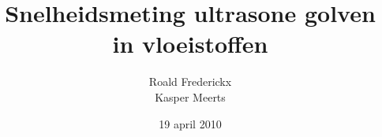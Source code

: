 \documentclass[11pt,a4paper]{article}
\author{Roald Frederickx\\Kasper Meerts}
\title{Snelheidsmeting ultrasone golven in vloeistoffen}
\date{19 april 2010}
\begin{document}
\graphicspath{{"./afbeeldingen/"}}
\maketitle






\end{document}
